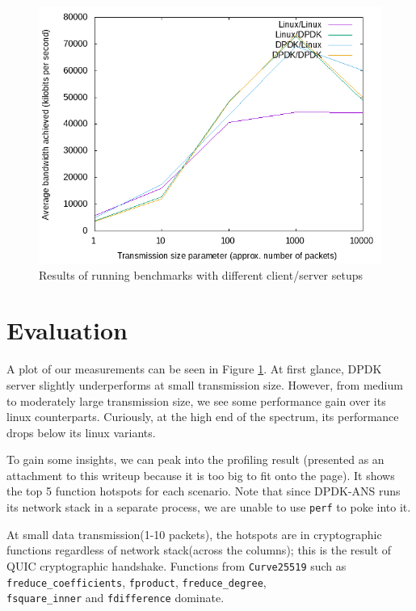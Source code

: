 \documentclass{sig-alternate-05-2015}
\begin{document}
\begin{figure}[bh]
\centering
\includegraphics[scale=0.5]{plot.png}
\caption{Results of running benchmarks with different client/server setups}
\label{fig:benchmark}
\end{figure}

\section{Evaluation}
A plot of our measurements can be seen in Figure \ref{fig:benchmark}. At first glance, DPDK server slightly underperforms at small transmission size. However, from medium to moderately large transmission size, we see some performance gain over its linux counterparts. Curiously, at the high end of the spectrum, its performance drops below its linux variants. 

To gain some insights, we can peak into the profiling result (presented as an attachment to this writeup because it is too big to fit onto the page). It shows the top 5 function hotspots for each scenario. Note that since DPDK-ANS runs its network stack in a separate process, we are unable to use \texttt{perf} to poke into it. 

At small data transmission(1-10 packets), the hotspots are in cryptographic functions regardless of network stack(across the columns); this is the result of QUIC cryptographic handshake. Functions from \verb|Curve25519| such as\\ \verb|freduce_coefficients|, \verb|fproduct|, \verb|freduce_degree|, \\ \verb|fsquare_inner| and \verb|fdifference| dominate.
\end{document}
